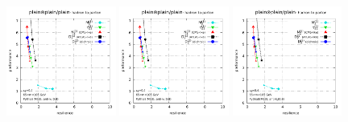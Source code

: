 \documentclass[11pt,letterpaper]{article}
\begin{document}
\begin{figure}
  \includegraphics[width=0.32\textwidth,page=61]{figures/shape-scan-levels.pdf}
  \hfill
  \includegraphics[width=0.32\textwidth,page=55]{figures/shape-scan-levels.pdf}
  \hfill
  \includegraphics[width=0.32\textwidth,page=49]{figures/shape-scan-levels.pdf}
  \caption{}\label{fig:shapes-hadronisation}
\end{figure}
\end{document}
